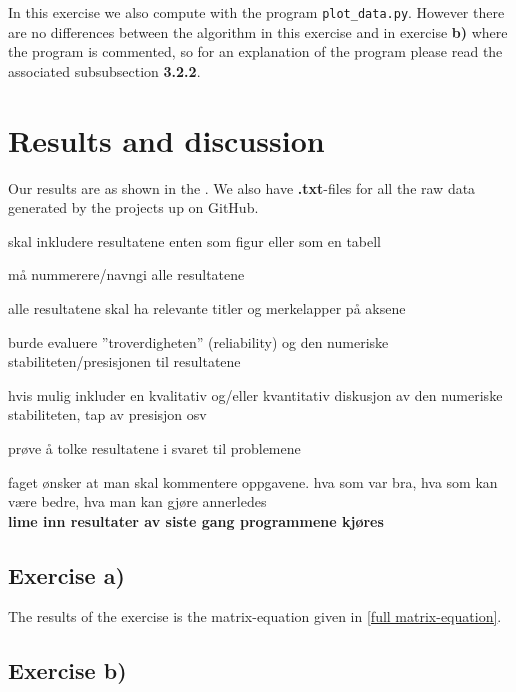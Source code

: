 \documentclass{article}
\begin{document}
    In this exercise we also compute with the program \texttt{plot\_data.py}. However there are no differences between the algorithm in this exercise and in exercise \textbf{b)} where the program is commented, so for an explanation of the program please read the associated subsubsection \textbf{3.2.2}.



\vspace{1cm}

\section{Results and discussion} \label{Results}

  Our results are as shown in the . We also have \textbf{.txt}-files for all the raw data generated by the projects up on GitHub.

  skal inkludere resultatene enten som figur eller som en tabell

  må nummerere/navngi alle resultatene

  alle resultatene skal ha relevante titler og merkelapper på aksene

  burde evaluere ''troverdigheten'' (reliability) og den numeriske stabiliteten/presisjonen til resultatene

  hvis mulig inkluder en kvalitativ og/eller kvantitativ diskusjon av den numeriske stabiliteten, tap av presisjon osv

  prøve å tolke resultatene i svaret til problemene

  faget ønsker at man skal kommentere oppgavene. hva som var bra, hva som kan være bedre, hva man kan gjøre annerledes \\

  {\bf lime inn resultater av siste gang programmene kjøres} \\

  \subsection{Exercise a)} \label{Results a)}

  The results of the exercise is the matrix-equation given in \ref{full matrix-equation}.

  \subsection{Exercise b)} \label{Results b)}
\end{document}
